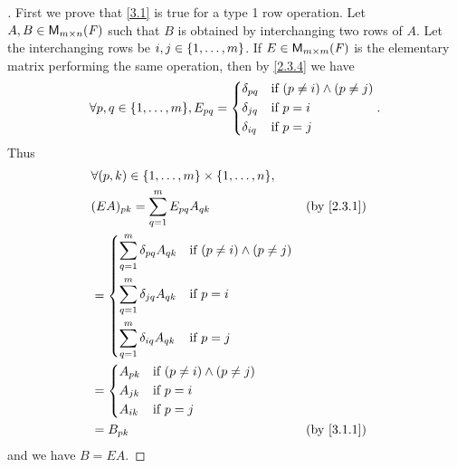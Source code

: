 \begin{proof}[]
  First we prove that \cref{3.1} is true for a type 1 row operation.
  Let \(A, B \in \ms\) such that \(B\) is obtained by interchanging two rows of \(A\).
  Let the interchanging rows be \(i, j \in \left\lbrace1, \dots, m\right\rbrace\).
  If \(E \in \ms[m][m][\F]\) is the elementary matrix performing the same operation, then by \cref{2.3.4} we have
  \[
    \forall p, q \in \set{1, \dots, m}, E_{p q} = \begin{dcases}
      \delta_{p q} & \text{if } (p \neq i) \land (p \neq j) \\
      \delta_{j q} & \text{if } p = i                       \\
      \delta_{i q} & \text{if } p = j
    \end{dcases}.
  \]
  Thus
  \begin{align*}
     & \forall (p, k) \in \set{1, \dots, m} \times \set{1, \dots, n},                                  \\
     & (EA)_{p k} = \sum_{q = 1}^m E_{p q} A_{q k}                                     &  & \by{2.3.1} \\
     & = \begin{dcases}
           \sum_{q = 1}^m \delta_{p q} A_{q k} & \text{if } (p \neq i) \land (p \neq j) \\
           \sum_{q = 1}^m \delta_{j q} A_{q k} & \text{if } p = i                       \\
           \sum_{q = 1}^m \delta_{i q} A_{q k} & \text{if } p = j
         \end{dcases}                  \\
     & = \begin{dcases}
           A_{p k} & \text{if } (p \neq i) \land (p \neq j) \\
           A_{j k} & \text{if } p = i                       \\
           A_{i k} & \text{if } p = j
         \end{dcases}                                              \\
     & = B_{p k}                                                                       &  & \by{3.1.1}
  \end{align*}
  and we have \(B = EA\).


\end{proof}
